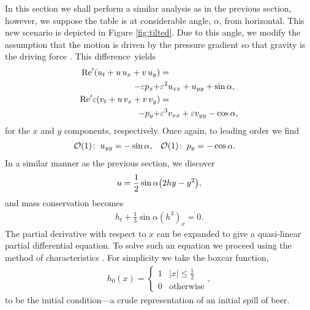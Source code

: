 \documentclass[11pt,a4paper,twocolumn]{article}
\let\originalleft\left
\let\originalright\right
\renewcommand{\left}{\mathopen{}\mathclose\bgroup\originalleft}
\renewcommand{\right}{\aftergroup\egroup\originalright}
\newcommand{\eps}{\varepsilon}
\providecommand{\bigO}[1]{\ensuremath{\mathop{}\mathopen{}\mathcal{O}\mathopen{}\left(#1\right)}}
\begin{document}
In this section we shall perform a similar analysis as in the previous section, however, we suppose the table is at considerable angle, $\alpha$, from horizontal. This new scenario is depicted in Figure \ref{fig:tilted}. Due to this angle, we modify the assumption that the motion is driven by the pressure gradient so that gravity is the driving force \cite{howison}. This difference~yields
\begin{equation}
\begin{aligned}
\text{Re}' \left( u_t + u \, u_x + v \, u_y \right) &= \\
- \eps p_x + &\eps^2 u_{xx} + u_{yy} + \sin \alpha, \\
\text{Re}' \eps \left( v_t + u \, v_x + v \, v_y \right) &= \\
- p_y + &\eps^3 v_{xx} + \eps v_{yy} - \cos \alpha,
\end{aligned}
\end{equation}
for the $x$ and $y$ components, respectively. Once again, to leading order we find
\begin{align}
\bigO{1} \colon \> u_{yy} &= - \sin \alpha, & \bigO{1} \colon \> p_y &= - \cos \alpha.
\end{align}
In a similar manner as the previous section, we discover
\begin{align}
u = \frac{1}{2} \sin \alpha \left( 2hy - y^2 \right),
\end{align}
and mass conservation becomes
\begin{align}
h_t + \frac{1}{3} \sin \alpha (h^3)_x = 0.
\label{eq:char}
\end{align}
The partial derivative with respect to $x$ can be expanded to give a quasi-linear partial differential equation. To solve such an equation we proceed using the method of characteristics \cite{zwillinger}. For simplicity we take the boxcar function,
\begin{align}
h_0(x) =
\begin{cases}
1 & |x| \leq \frac{1}{2} \\
0 & \text{otherwise}
\end{cases},
\label{eq:ic}
\end{align}
to be the initial condition---a crude representation of an initial spill of beer.
\end{document}
